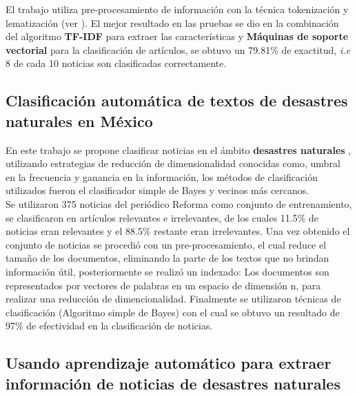 El trabajo utiliza  pre-procesamiento de información con la técnica tokenización y lematización (ver ). El mejor resultado en las pruebas se dio en la combinación del algoritmo \textbf{TF-IDF} para extraer las características y \textbf{Máquinas de soporte vectorial} para la clasificación de artículos, se obtuvo un 79.81\% de exactitud, \textit{i.e} 8 de cada 10 noticias son clasificadas correctamente.\\



\begin{large}
	 \subsection[Desastres naturales en México]{Clasificación automática de textos de desastres naturales en México}
\end{large}

En este trabajo se propone clasificar noticias en el ámbito \textbf{desastres naturales} \citep{CD9}, utilizando estrategias de reducción de dimensionalidad conocidas como, umbral en la frecuencia y ganancia en la información, los métodos de clasificación utilizados fueron el clasificador simple de Bayes y vecinos más cercanos.\\

Se utilizaron 375 noticias del periódico Reforma como conjunto de entrenamiento, se clasificaron en artículos relevantes e irrelevantes, de los cuales 11.5\% de noticias eran relevantes y el 88.5\% restante eran irrelevantes. Una vez obtenido el conjunto de noticias se procedió con un pre-procesamiento, el cual reduce el tamaño de los documentos, eliminando la parte de los textos que no brindan información útil, posteriormente se realizó un indexado: Los documentos son representados por vectores de palabras en un espacio de dimensión n, para realizar una reducción de dimencionalidad. Finalmente se utilizaron técnicas de clasificación (Algoritmo simple de Bayes) con el cual se obtuvo un resultado de 97\% de efectividad en la clasificación de noticias.\\



\begin{large}
	 \subsection[Extraer información de noticias de DN]{Usando aprendizaje automático para extraer información de noticias de desastres naturales}
\end{large}


